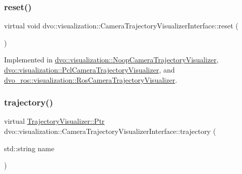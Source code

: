 \subsubsection{\texorpdfstring{reset()}{reset()}}
{\footnotesize\ttfamily virtual void dvo\+::visualization\+::\+Camera\+Trajectory\+Visualizer\+Interface\+::reset (\begin{DoxyParamCaption}{ }\end{DoxyParamCaption})\hspace{0.3cm}{\ttfamily [pure virtual]}}



Implemented in \mbox{\hyperlink{classdvo_1_1visualization_1_1_noop_camera_trajectory_visualizer_afa3b5e4aff0306755ca3b53ef70008c4}{dvo\+::visualization\+::\+Noop\+Camera\+Trajectory\+Visualizer}}, \mbox{\hyperlink{classdvo_1_1visualization_1_1_pcl_camera_trajectory_visualizer_a1dd833071b1343a97c0366d3ced0799b}{dvo\+::visualization\+::\+Pcl\+Camera\+Trajectory\+Visualizer}}, and \mbox{\hyperlink{classdvo__ros_1_1visualization_1_1_ros_camera_trajectory_visualizer_a1900ce8a2c17014fef1a4375d8fd6e92}{dvo\+\_\+ros\+::visualization\+::\+Ros\+Camera\+Trajectory\+Visualizer}}.

\mbox{\label{classdvo_1_1visualization_1_1_camera_trajectory_visualizer_interface_ac658e841335e51c50325267de10e64b3}} 
\subsubsection{\texorpdfstring{trajectory()}{trajectory()}}
{\footnotesize\ttfamily virtual \mbox{\hyperlink{classdvo_1_1visualization_1_1_trajectory_visualizer_aac33ef5979fe64ee33409f1afa977fd3}{Trajectory\+Visualizer\+::\+Ptr}} dvo\+::visualization\+::\+Camera\+Trajectory\+Visualizer\+Interface\+::trajectory (\begin{DoxyParamCaption}\item[{std\+::string}]{name }\end{DoxyParamCaption})\hspace{0.3cm}{\ttfamily [pure virtual]}}



